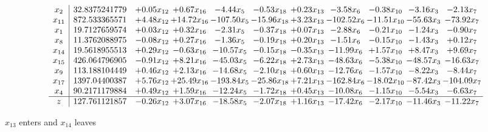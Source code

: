 \documentclass[9pt]{article}
\begin{document}
 \[\begin{array}{c| c c@{\hskip 2pt} c@{\hskip 2pt} c@{\hskip 2pt} c@{\hskip 2pt} c@{\hskip 2pt} c@{\hskip 2pt} c@{\hskip 2pt} c@{\hskip 2pt} c@{\hskip 2pt} }
 x_{2}   &  32.8375241779 & +  0.05 x_{12} & +  0.67 x_{16} & -4.44 x_{5} & -0.53 x_{18} & +  0.23 x_{13} & -3.58 x_{6} & -0.38 x_{10} & -3.16 x_{3} & -2.13 x_{7}\\
 x_{11}   &  872.533365571 & +  4.48 x_{12} & + 14.72 x_{16} & -107.50 x_{5} & -15.96 x_{18} & +  3.23 x_{13} & -102.52 x_{6} & -11.51 x_{10} & -55.63 x_{3} & -73.92 x_{7}\\
 x_{1}   &  19.7127659574 & +  0.03 x_{12} & +  0.32 x_{16} & -2.31 x_{5} & -0.37 x_{18} & +  0.07 x_{13} & -2.88 x_{6} & -0.21 x_{10} & -1.24 x_{3} & -0.90 x_{7}\\
 x_{8}   &  11.3762088975 & -0.08 x_{12} & +  0.27 x_{16} & -1.36 x_{5} & -0.19 x_{18} & +  0.20 x_{13} & -1.51 x_{6} & -0.15 x_{10} & -1.43 x_{3} & +  0.12 x_{7}\\
 x_{14}   &  19.5618955513 & +  0.29 x_{12} & -0.63 x_{16} & -10.57 x_{5} & -0.15 x_{18} & -0.35 x_{13} & -11.99 x_{6} & +  1.57 x_{10} & +  8.47 x_{3} & +  9.69 x_{7}\\
 x_{15}   &  426.064796905 & -0.91 x_{12} & +  8.21 x_{16} & -45.03 x_{5} & -6.22 x_{18} & +  2.73 x_{13} & -48.63 x_{6} & -5.38 x_{10} & -48.57 x_{3} & -16.63 x_{7}\\
 x_{9}   &  113.188104449 & +  0.46 x_{12} & +  2.13 x_{16} & -14.68 x_{5} & -2.10 x_{18} & +  0.60 x_{13} & -12.76 x_{6} & -1.57 x_{10} & -8.22 x_{3} & -8.44 x_{7}\\
 x_{17}   &  1397.04400387 & +  5.76 x_{12} & + 25.49 x_{16} & -193.84 x_{5} & -25.86 x_{18} & +  7.21 x_{13} & -162.84 x_{6} & -18.02 x_{10} & -87.42 x_{3} & -104.09 x_{7}\\
 x_{4}   &  90.2171179884 & +  0.49 x_{12} & +  1.59 x_{16} & -12.24 x_{5} & -1.72 x_{18} & +  0.45 x_{13} & -10.08 x_{6} & -1.15 x_{10} & -5.54 x_{3} & -6.63 x_{7}\\
\hline
z    &  127.761121857 & -0.26 x_{12} & +  3.07 x_{16} & -18.58 x_{5} & -2.07 x_{18} & +  1.16 x_{13} & -17.42 x_{6} & -2.17 x_{10} & -11.46 x_{3} & -11.22 x_{7}\\
\end{array}\]


 $ x_{13} $ enters and $ x_{14} $ leaves 
\end{document}
